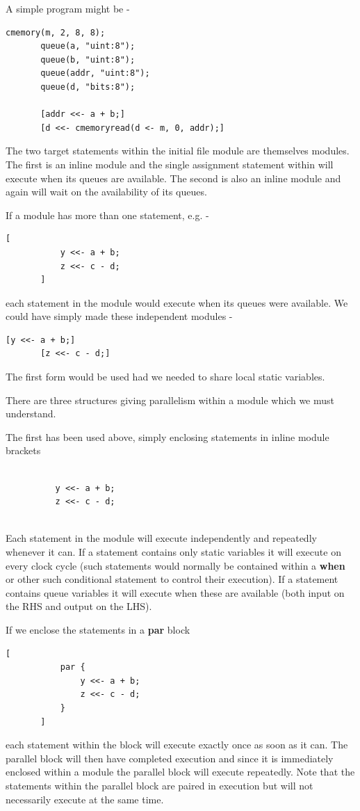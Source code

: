    A simple program might be -
    \begin{lstlisting}[gobble=4, language=threepl]
       cmemory(m, 2, 8, 8);
       queue(a, "uint:8");
       queue(b, "uint:8");
       queue(addr, "uint:8");
       queue(d, "bits:8");

       [addr <<- a + b;]
       [d <<- cmemoryread(d <- m, 0, addr);]
    \end{lstlisting}
    The two target statements within the initial file module are themselves
    modules. The first is an inline module and the single assignment
    statement within will execute when its queues are available. The second is
    also an inline module and again will wait on the availability of its
    queues.

    If a module has more than one statement, e.g. -
    \begin{lstlisting}[gobble=4, language=threepl]
       [
           y <<- a + b;
           z <<- c - d;
       ]
    \end{lstlisting}
    each statement in the module would execute when its
    queues were available. We could have simply made these
    independent modules -
    \begin{lstlisting}[gobble=4, language=threepl]
       [y <<- a + b;]
       [z <<- c - d;]
    \end{lstlisting}
    The first form would be used had we needed to share
    local static variables.

    There are three structures giving parallelism within a module
    which we must understand.

    The first has been used above, simply enclosing statements
    in inline module brackets
    \begin{lstlisting}[gobble=4, language=threepl]
       
          y <<- a + b;
          z <<- c - d;
       
    \end{lstlisting}
    Each statement in the module will execute independently and repeatedly
    whenever it can. If a statement contains only static variables it will
    execute on every clock cycle (such statements would normally be contained
    within a {\bf when} or other such conditional statement to control their
    execution). If a statement contains queue variables it will execute when
    these are available (both input on the RHS and output on the LHS).

    If we enclose the statements in a {\bf par} block
    \begin{lstlisting}[gobble=4, language=threepl]
       [
           par {
               y <<- a + b;
               z <<- c - d;
           }
       ]
    \end{lstlisting}
    each statement within the block will execute exactly once as
    soon as it can. The parallel block will then have completed
    execution and since it is immediately enclosed within a module
    the parallel block will execute repeatedly. Note that the
    statements within the parallel block are paired in execution but
    will not necessarily execute at the same time.

